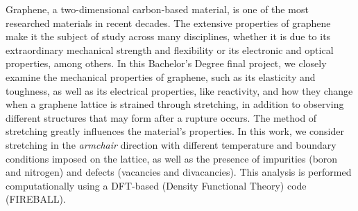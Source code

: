 Graphene, a two-dimensional carbon-based material, is one of the most researched materials in recent decades. The extensive properties of graphene make it the subject of study across many disciplines, whether it is due to its extraordinary mechanical strength and flexibility or its electronic and optical properties, among others. In this Bachelor's Degree final project, we closely examine the mechanical properties of graphene, such as its elasticity and toughness, as well as its electrical properties, like reactivity, and how they change when a graphene lattice is strained through stretching, in addition to observing different structures that may form after a rupture occurs. The method of stretching greatly influences the material's properties. In this work, we consider stretching in the \emph{armchair} direction with different temperature and boundary conditions imposed on the lattice, as well as the presence of impurities (boron and nitrogen) and defects (vacancies and divacancies). This analysis is performed computationally using a DFT-based (Density Functional Theory) code (FIREBALL).\\


